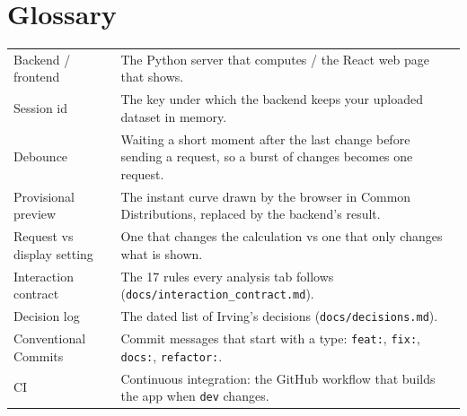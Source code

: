\documentclass[11pt,a4paper]{article}
\newcommand{\f}[1]{\texttt{#1}}
\begin{document}
\section{Glossary}
\begin{tabularx}{\textwidth}{@{}>{\raggedright\arraybackslash}p{3.6cm}L@{}}
\toprule
Backend / frontend & The Python server that computes / the React web page that shows. \\
Session id & The key under which the backend keeps your uploaded dataset in memory. \\
Debounce & Waiting a short moment after the last change before sending a request, so a burst of changes becomes one request. \\
Provisional preview & The instant curve drawn by the browser in Common Distributions, replaced by the backend's result. \\
Request vs display setting & One that changes the calculation vs one that only changes what is shown. \\
Interaction contract & The 17 rules every analysis tab follows (\f{docs/interaction\_contract.md}). \\
Decision log & The dated list of Irving's decisions (\f{docs/decisions.md}). \\
Conventional Commits & Commit messages that start with a type: \f{feat:}, \f{fix:}, \f{docs:}, \f{refactor:}. \\
CI & Continuous integration: the GitHub workflow that builds the app when \f{dev} changes. \\
\bottomrule
\end{tabularx}
\end{document}
